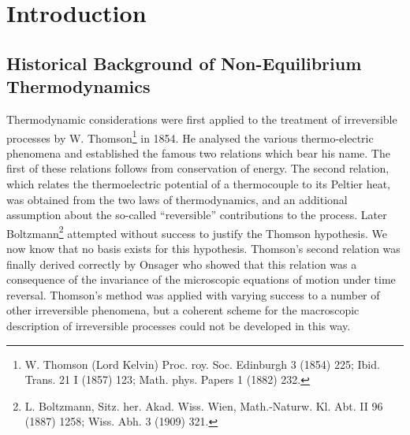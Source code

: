 \chapter{Introduction}

\section{Historical Background of Non-Equilibrium Thermodynamics}

Thermodynamic considerations were first applied to the treatment of irreversible processes by W. Thomson\footnote{W. Thomson (Lord Kelvin) Proc. roy. Soc. Edinburgh 3 (1854) 225; Ibid. Trans. 21 I (1857) 123; Math. phys. Papers 1 (1882) 232.} in 1854. He analysed the various thermo-electric phenomena and established the famous two relations which bear his name. The first of these relations follows from conservation of energy. The second relation, which relates the thermoelectric potential of a thermocouple to its Peltier heat, was obtained from the two laws of thermodynamics, and an additional assumption about the so-called ``reversible'' contributions to the process. Later Boltzmann\footnote{L. Boltzmann, Sitz. her. Akad. Wiss. Wien, Math.-Naturw. Kl. Abt. II 96 (1887) 1258; Wiss. Abh. 3 (1909) 321.} attempted without success to justify the Thomson hypothesis. We now know that no basis exists for this hypothesis. Thomson's second relation was finally derived correctly by Onsager who showed that this relation was a consequence of the invariance of the microscopic equations of motion under time reversal. Thomson's method was applied with varying success to a number of other irreversible phenomena, but a coherent scheme for the macroscopic description of irreversible processes could not be developed in this way.

